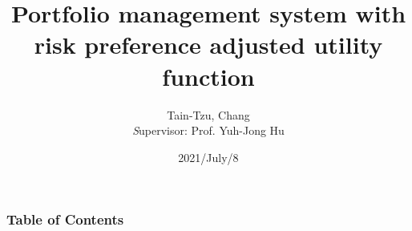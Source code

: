 \documentclass{beamer}
\title{Portfolio management system with risk preference adjusted utility function}
\author{
{Tain-Tzu, Chang}
\\
{\textit Supervisor:} 
{Prof. Yuh-Jong Hu}
}
\institute{Department of Computer Science, NCCU}
\date{2021/July/8}
\begin{document}
\frame{\titlepage}

\begin{frame}
\frametitle{Table of Contents}
\tableofcontents
\end{frame}






\end{document}
